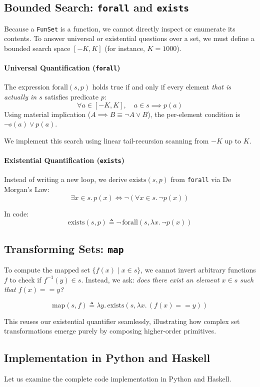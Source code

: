 \subsection{Bounded Search: \texttt{forall} and \texttt{exists}}

Because a \texttt{FunSet} is a function, we cannot directly inspect or enumerate its contents. To answer universal or existential questions over a set, we must define a bounded search space $[-K, K]$ (for instance, $K = 1000$).

\paragraph{Universal Quantification (\texttt{forall})}
The expression $\text{forall}(s, p)$ holds true if and only if every element \textit{that is actually in $s$} satisfies predicate $p$:
\[ \forall a \in [-K, K], \quad a \in s \implies p(a) \]
Using material implication ($A \implies B \equiv \neg A \lor B$), the per-element condition is $\neg s(a) \lor p(a)$.

We implement this search using linear tail-recursion scanning from $-K$ up to $K$.

\paragraph{Existential Quantification (\texttt{exists})}
Instead of writing a new loop, we derive $\text{exists}(s, p)$ from \texttt{forall} via De Morgan's Law:
\[ \exists x \in s.\, p(x) \iff \neg (\forall x \in s.\, \neg p(x)) \]

In code:
\[ \text{exists}(s, p) \triangleq \neg\,\text{forall}(s, \lambda x.\, \neg p(x)) \]

\subsection{Transforming Sets: \texttt{map}}

To compute the mapped set $\{ f(x) \mid x \in s \}$, we cannot invert arbitrary functions $f$ to check if $f^{-1}(y) \in s$. Instead, we ask: \textit{does there exist an element $x \in s$ such that $f(x) == y$?}

\[ \text{map}(s, f) \triangleq \lambda y.\, \text{exists}(s, \lambda x.\, (f(x) == y)) \]

This reuses our existential quantifier seamlessly, illustrating how complex set transformations emerge purely by composing higher-order primitives.

\subsection{Implementation in Python and Haskell}

Let us examine the complete code implementation in Python and Haskell.




